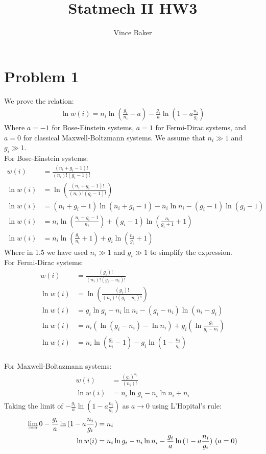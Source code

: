 \documentclass[a4paper,11pt]{article}
\title{Statmech II HW3}
\author{Vince Baker}
\numberwithin{equation}{section}
\begin{document}
\maketitle

\section{Problem 1}
We prove the relation:
\begin{align}
 \ln{w(i)} = n_i\ln{(\frac{g_i}{n_i}-a)}-\frac{g_i}{a}\ln{(1-a\frac{n_i}{g_i})}
\end{align}
Where $a=-1$ for Bose-Einstein systems, $a=1$ for Fermi-Dirac systems, and $a=0$ for classical Maxwell-Boltzmann systems.
We assume that $n_i\gg 1$ and $g_i \gg 1$.\\
For Bose-Einstein systems:
\begin{align}
 w(i) &= \frac{(n_i+g_i-1)!}{(n_i)!(g_i-1)!}\\
 \ln{w(i)} &= \ln{\left(\frac{(n_i+g_i-1)!}{(n_i)!(g_i-1)!} \right)}\\
 \ln{w(i)} &= (n_i+g_i-1)\ln{(n_i+g_i-1)}-n_i\ln{n_i}-(g_i-1)\ln{(g_i-1)}\\
 \ln{w(i)} &= n_i\ln{\left(\frac{n_i+g_i-1}{n_i}\right)} +(g_i-1)\ln{(\frac{n_i}{g_i+1}+1)}\\
 \ln{w(i)} &= n_i\ln{\left(\frac{g_i}{n_i}+1\right)} +g_i\ln{(\frac{n_i}{g_i}+1)}
\end{align}
Where in 1.5 we have used $n_i\gg 1$ and $g_i \gg 1$ to simplify the expression.
\\
For Fermi-Dirac systems:
\begin{align}
  w(i) &= \frac{(g_i)!}{(n_i)!(g_i-n_i)!}\\
 \ln{w(i)} &= \ln{\left(\frac{(g_i)!}{(n_i)!(g_i-n_i)!} \right)}\\
 \ln{w(i)} &= g_i\ln{g_i}-n_i\ln{n_i}-(g_i-n_i)\ln{(n_i-g_i)}\\
 \ln{w(i)} &= n_i\left(\ln{(g_i-n_i)}-\ln{n_i} \right)+g_i\left(\ln{\frac{g_i}{g_i-n_i}} \right)\\
 \ln{w(i)} &= n_i\ln{\left(\frac{g_i}{n_i}-1 \right)}-g_i\ln{\left(1-\frac{n_i}{g_i} \right)}
\end{align}
\\
For Maxwell-Boltazmann systems:
\begin{align}
  w(i) &= \frac{(g_i)^{n_i}}{(n_i)!}\\
 \ln{w(i)} &= n_i\ln{g_i}-n_i\ln{n_i}+n_i
\end{align}
Taking the limit of $-\frac{g_i}{a}\ln{(1-a\frac{n_i}{g_i})} $ as $a \rightarrow 0$ using L'Hopital's rule:
\begin{align}
 \varinjlim 0 -\frac{g_i}{a}\ln{(1-a\frac{n_i}{g_i})} &= n_i\\
 \ln{w(i)} &= n_i\ln{g_i}-n_i\ln{n_i}-\frac{g_i}{a}\ln{(1-a\frac{n_i}{g_i})}\ (a=0)
\end{align}
\\
\end{document}

